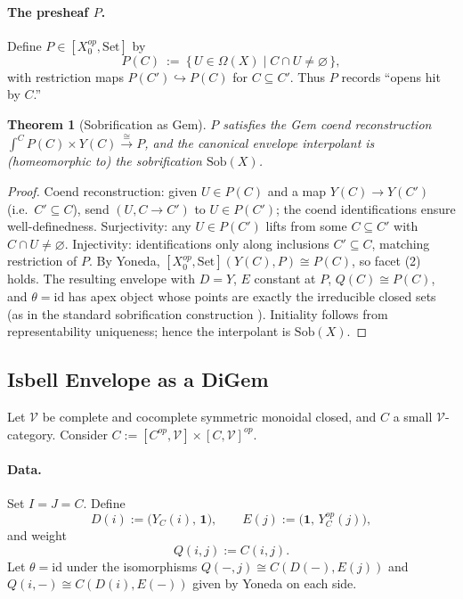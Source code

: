 \documentclass[11pt]{article}
\theoremstyle{plain}
\newtheorem{theorem}{Theorem}[section]
\theoremstyle{definition}
\theoremstyle{remark}
\newcommand{\V}{\mathcal{V}}
\newcommand{\Set}{\mathrm{Set}}
\newcommand{\Sob}{\mathrm{Sob}}
\begin{document}
\paragraph{The presheaf $P$.}
Define $P\in [X_0^{op},\Set]$ by
$$
P(C) \ :=\ \{\,U\in \Omega(X)\mid C\cap U\neq \varnothing\,\},
$$
with restriction maps $P(C')\hookrightarrow P(C)$ for $C\subseteq C'$. Thus $P$ records “opens hit by $C$.”

\begin{theorem}[Sobrification as Gem]
$P$ satisfies the Gem coend reconstruction $\int^{C}P(C)\times Y(C)\xrightarrow{\ \cong\ } P$, and the canonical envelope interpolant is (homeomorphic to) the sobrification $\Sob(X)$.
\end{theorem}

\begin{proof}
Coend reconstruction: given $U\in P(C)$ and a map $Y(C)\to Y(C')$ (i.e.\ $C'\subseteq C$), send $(U,C\to C')$ to $U\in P(C')$; the coend identifications ensure well-definedness. Surjectivity: any $U\in P(C')$ lifts from some $C\subseteq C'$ with $C\cap U\neq\varnothing$. Injectivity: identifications only along inclusions $C'\subseteq C$, matching restriction of $P$. By Yoneda, $[X_0^{op},\Set](Y(C),P)\cong P(C)$, so facet (2) holds. The resulting envelope with $D=Y$, $E$ constant at $P$, $Q(C)\cong P(C)$, and $\theta=\mathrm{id}$ has apex object whose points are exactly the irreducible closed sets (as in the standard sobrification construction \cite{johnstone1982stone}). Initiality follows from representability uniqueness; hence the interpolant is $\Sob(X)$.
\end{proof}

\subsection{Isbell Envelope as a DiGem}\label{ssec:digem-isbell}

Let $\V$ be complete and cocomplete symmetric monoidal closed, and $C$ a small $\V$-category. Consider $C:=[C^{op},\V]\times [C,\V]^{op}$.

\paragraph{Data.}
Set $I=J=C$. Define
$$
D(i) := \big(Y_C(i),\,\mathbf{1}\big),\qquad
E(j) := \big(\mathbf{1},\,Y_C^{op}(j)\big),
$$
and weight
$$
Q(i,j) := C(i,j).
$$
Let $\theta=\mathrm{id}$ under the isomorphisms $Q(-,j)\cong C(D(-),E(j))$ and $Q(i,-)\cong C(D(i),E(-))$ given by Yoneda on each side.
\end{document}
